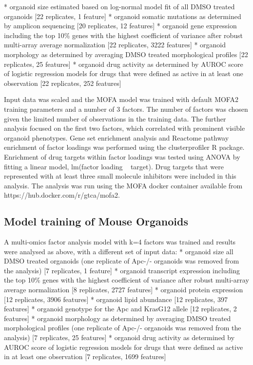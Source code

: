 \begin{flushleft}
* organoid size estimated based on log-normal model fit of all DMSO treated organoids [22 replicates, 1 feature]
* organoid somatic mutations as determined by amplicon sequencing [20 replicates, 12 features]
* organoid gene expression including the top 10\% genes with the highest coefficient of variance after robust multi-array average normalization [22 replicates, 3222 features]
* organoid morphology as determined by averaging DMSO treated morphological profiles [22 replicates, 25 features]
* organoid drug activity as determined by AUROC score of logistic regression models for drugs that were defined as active in at least one observation [22 replicates, 252 features]

Input data was scaled and the MOFA model was trained with default MOFA2 training parameters and a number of 3 factors. The number of factors was chosen given the limited number of observations in the training data. The further analysis focused on the first two factors, which correlated with prominent visible organoid phenotypes. Gene set enrichment analysis and Reactome pathway enrichment of factor loadings was performed using the clusterprofiler R package. Enrichment of drug targets within factor loadings was tested using ANOVA by fitting a linear model, lm(factor loading ~ target). Drug targets that were represented with at least three small molecule inhibitors were included in this analysis. The analysis was run using the MOFA docker container available from https://hub.docker.com/r/gtca/mofa2.

\subsection{Model training of Mouse Organoids}
A multi-omics factor analysis model with k=4 factors was trained and results were analysed as above, with a different set of input data: 
* organoid size all DMSO treated organoids (one replicate of Apc-/- organoids was removed from the analysis) [7 replicates, 1 feature]
* organoid transcript expression including the top 10\% genes with the highest coefficient of variance after robust multi-array average normalization [8 replicates, 2727 features]
* organoid protein expression [12 replicates, 3906 features]
* organoid lipid abundance [12 replicates, 397 features]
* organoid genotype for the Apc and KrasG12 allele [12 replicates, 2 features]
* organoid morphology as determined by averaging DMSO treated morphological profiles (one replicate of Apc-/- organoids was removed from the analysis) [7 replicates, 25 features]
* organoid drug activity as determined by AUROC score of logistic regression models for drugs that were defined as active in at least one observation [7 replicates, 1699 features]


\end{flushleft}
